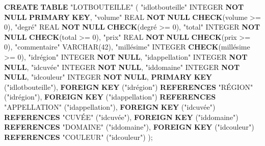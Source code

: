 \documentclass[11pt]{article}
\newenvironment{Shaded}{}{}
\newcommand{\KeywordTok}[1]{\textcolor[rgb]{0.00,0.44,0.13}{\textbf{{#1}}}}
\newcommand{\DataTypeTok}[1]{\textcolor[rgb]{0.56,0.13,0.00}{{#1}}}
\newcommand{\DecValTok}[1]{\textcolor[rgb]{0.25,0.63,0.44}{{#1}}}
\newcommand{\OtherTok}[1]{\textcolor[rgb]{0.00,0.44,0.13}{{#1}}}
\newcommand{\NormalTok}[1]{{#1}}
\newcommand{\OperatorTok}[1]{\textcolor[rgb]{0.40,0.40,0.40}{{#1}}}
\begin{document}
\begin{Shaded}
\begin{Highlighting}[]
\KeywordTok{CREATE} \KeywordTok{TABLE} \OtherTok{"LOTBOUTEILLE"}\NormalTok{ (}
  \OtherTok{"idlotbouteille"} \DataTypeTok{INTEGER} \KeywordTok{NOT} \KeywordTok{NULL} \KeywordTok{PRIMARY} \KeywordTok{KEY}\NormalTok{,}
  \OtherTok{"volume"} \DataTypeTok{REAL} \KeywordTok{NOT} \KeywordTok{NULL} \KeywordTok{CHECK}\NormalTok{(volume }\OperatorTok{>=} \DecValTok{0}\NormalTok{),}
  \OtherTok{"degré"} \DataTypeTok{REAL} \KeywordTok{NOT} \KeywordTok{NULL} \KeywordTok{CHECK}\NormalTok{(degré }\OperatorTok{>=} \DecValTok{0}\NormalTok{),}
  \OtherTok{"total"} \DataTypeTok{INTEGER} \KeywordTok{NOT} \KeywordTok{NULL} \KeywordTok{CHECK}\NormalTok{(total }\OperatorTok{>=} \DecValTok{0}\NormalTok{),}
  \OtherTok{"prix"} \DataTypeTok{REAL} \KeywordTok{NOT} \KeywordTok{NULL} \KeywordTok{CHECK}\NormalTok{(prix }\OperatorTok{>=} \DecValTok{0}\NormalTok{),}
  \OtherTok{"commentaire"} \DataTypeTok{VARCHAR}\NormalTok{(}\DecValTok{42}\NormalTok{),}
  \OtherTok{"millésime"} \DataTypeTok{INTEGER} \KeywordTok{CHECK}\NormalTok{(millésime }\OperatorTok{>=} \DecValTok{0}\NormalTok{),}
  \OtherTok{"idrégion"} \DataTypeTok{INTEGER} \KeywordTok{NOT} \KeywordTok{NULL}\NormalTok{,}
  \OtherTok{"idappellation"} \DataTypeTok{INTEGER} \KeywordTok{NOT} \KeywordTok{NULL}\NormalTok{,}
  \OtherTok{"idcuvée"} \DataTypeTok{INTEGER} \KeywordTok{NOT} \KeywordTok{NULL}\NormalTok{,}
  \OtherTok{"iddomaine"} \DataTypeTok{INTEGER} \KeywordTok{NOT} \KeywordTok{NULL}\NormalTok{,}
  \OtherTok{"idcouleur"} \DataTypeTok{INTEGER} \KeywordTok{NOT} \KeywordTok{NULL}\NormalTok{,}
  \KeywordTok{PRIMARY} \KeywordTok{KEY}\NormalTok{ (}\OtherTok{"idlotbouteille"}\NormalTok{),}
  \KeywordTok{FOREIGN} \KeywordTok{KEY}\NormalTok{ (}\OtherTok{"idrégion"}\NormalTok{) }\KeywordTok{REFERENCES} \OtherTok{"RÉGION"}\NormalTok{ (}\OtherTok{"idrégion"}\NormalTok{),}
  \KeywordTok{FOREIGN} \KeywordTok{KEY}\NormalTok{ (}\OtherTok{"idappellation"}\NormalTok{) }\KeywordTok{REFERENCES} \OtherTok{"APPELLATION"}\NormalTok{ (}\OtherTok{"idappellation"}\NormalTok{),}
  \KeywordTok{FOREIGN} \KeywordTok{KEY}\NormalTok{ (}\OtherTok{"idcuvée"}\NormalTok{) }\KeywordTok{REFERENCES} \OtherTok{"CUVÉE"}\NormalTok{ (}\OtherTok{"idcuvée"}\NormalTok{),}
  \KeywordTok{FOREIGN} \KeywordTok{KEY}\NormalTok{ (}\OtherTok{"iddomaine"}\NormalTok{) }\KeywordTok{REFERENCES} \OtherTok{"DOMAINE"}\NormalTok{ (}\OtherTok{"iddomaine"}\NormalTok{),}
  \KeywordTok{FOREIGN} \KeywordTok{KEY}\NormalTok{ (}\OtherTok{"idcouleur"}\NormalTok{) }\KeywordTok{REFERENCES} \OtherTok{"COULEUR"}\NormalTok{ (}\OtherTok{"idcouleur"}\NormalTok{)}
\NormalTok{);}


\end{Highlighting}
\end{Shaded}
\end{document}
